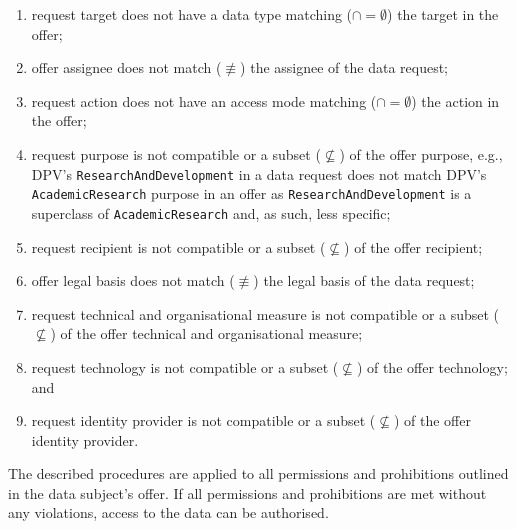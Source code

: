 \begin{enumerate}
    \item request target does not have a data type matching ($\cap=\emptyset$) the target in the offer;
    \item offer assignee does not match ($\not\equiv$) the assignee of the data request; 
    \item request action does not have an access mode matching ($\cap=\emptyset$) the action in the offer;
    \item request purpose is not compatible or a subset ($\not\subseteq$) of the offer purpose, e.g., DPV's \texttt{ResearchAndDevelopment} in a data request does not match DPV's \texttt{AcademicResearch} purpose in an offer as \texttt{ResearchAndDevelopment} is a superclass of \texttt{AcademicResearch} and, as such, less specific;
    \item request recipient is not compatible or a subset ($\not\subseteq$) of the offer recipient;
    \item offer legal basis does not match ($\not\equiv$) the legal basis of the data request;
    \item request technical and organisational measure is not compatible or a subset ($\not\subseteq$) of the offer technical and organisational measure;
    \item request technology is not compatible or a subset ($\not\subseteq$) of the offer technology; and
    \item request identity provider is not compatible or a subset ($\not\subseteq$) of the offer identity provider.
\end{enumerate}

The described procedures are applied to all permissions and prohibitions outlined in the data subject's offer.
If all permissions and prohibitions are met without any violations, access to the data can be authorised.

